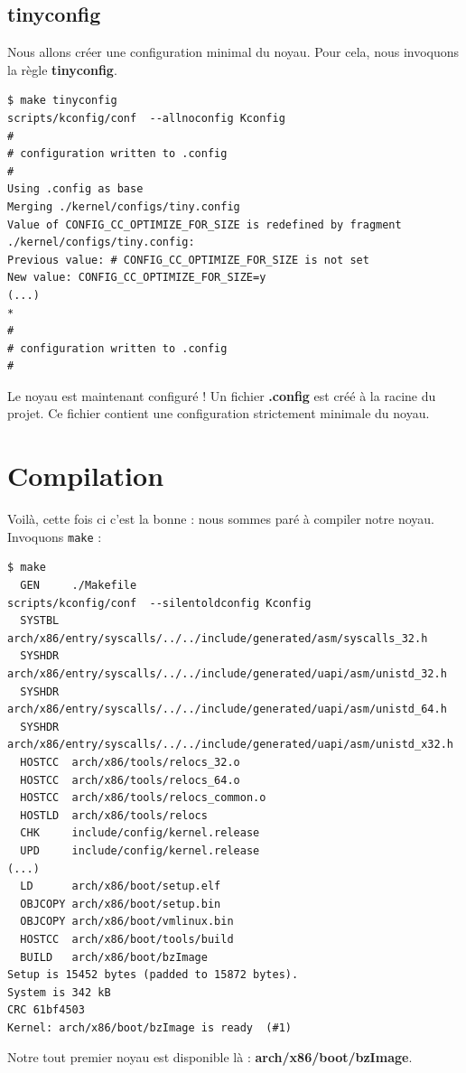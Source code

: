 \documentclass[a4paper]{article}
\begin{document}
\subsection{tinyconfig}

Nous allons créer une configuration minimal du noyau. Pour cela, nous invoquons la règle \textbf{tinyconfig}.

\begin{verbatim}
$ make tinyconfig
scripts/kconfig/conf  --allnoconfig Kconfig
#
# configuration written to .config
#
Using .config as base
Merging ./kernel/configs/tiny.config
Value of CONFIG_CC_OPTIMIZE_FOR_SIZE is redefined by fragment ./kernel/configs/tiny.config:
Previous value: # CONFIG_CC_OPTIMIZE_FOR_SIZE is not set
New value: CONFIG_CC_OPTIMIZE_FOR_SIZE=y
(...)
*
#
# configuration written to .config
#
\end{verbatim}

Le noyau est maintenant configuré ! Un fichier \textbf{.config} est créé à la racine du projet. Ce fichier contient une configuration strictement minimale du noyau.

\section{Compilation}

Voilà, cette fois ci c'est la bonne : nous sommes paré à compiler notre noyau. Invoquons \lstset{language=sh}\lstinline{make} :\\

\begin{verbatim}
$ make
  GEN     ./Makefile
scripts/kconfig/conf  --silentoldconfig Kconfig
  SYSTBL  arch/x86/entry/syscalls/../../include/generated/asm/syscalls_32.h
  SYSHDR  arch/x86/entry/syscalls/../../include/generated/uapi/asm/unistd_32.h
  SYSHDR  arch/x86/entry/syscalls/../../include/generated/uapi/asm/unistd_64.h
  SYSHDR  arch/x86/entry/syscalls/../../include/generated/uapi/asm/unistd_x32.h
  HOSTCC  arch/x86/tools/relocs_32.o
  HOSTCC  arch/x86/tools/relocs_64.o
  HOSTCC  arch/x86/tools/relocs_common.o
  HOSTLD  arch/x86/tools/relocs
  CHK     include/config/kernel.release
  UPD     include/config/kernel.release
(...)
  LD      arch/x86/boot/setup.elf
  OBJCOPY arch/x86/boot/setup.bin
  OBJCOPY arch/x86/boot/vmlinux.bin
  HOSTCC  arch/x86/boot/tools/build
  BUILD   arch/x86/boot/bzImage
Setup is 15452 bytes (padded to 15872 bytes).
System is 342 kB
CRC 61bf4503
Kernel: arch/x86/boot/bzImage is ready  (#1)
\end{verbatim}

Notre tout premier noyau est disponible là : \textbf{arch/x86/boot/bzImage}.

\clearpage
\listoffigures
\end{document}
